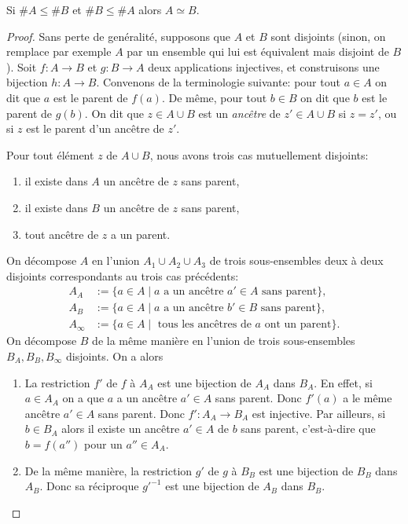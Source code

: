 \documentclass[french,course,oneside,theoremnosection]{lecture}
\begin{document}
\begin{theorem}
Si $\# A \leq \# B$ et $\# B \leq \# A$ alors $A \simeq B$.
\end{theorem}
\begin{proof}
Sans perte de genéralité, supposons que $A$ et $B$ sont disjoints (sinon, on remplace par exemple $A$ par un ensemble qui lui est équivalent mais disjoint de $B$).
Soit $f\colon A \to B$ et $g\colon B \to A$ deux applications injectives, et construisons une bijection $h\colon A \to B$. Convenons de la terminologie suivante: pour tout $a \in A$ on dit que $a$ est le parent de $f(a).$ De même, pour tout $b\in B$ on dit que $b$ est le parent de $g(b)$. On dit que $z\in A \cup B$ est un  \emph{ancêtre} de $z'\in A \cup B$ si $z=z'$, ou si $z$ est le parent d'un ancêtre de $z'$.

Pour tout élément $z$ de $A \cup B$, nous avons trois cas mutuellement disjoints:
\begin{enumerate}[(1)]
\item il existe dans $A$ un ancêtre de $z$ sans parent,
\item il existe dans $B$ un ancêtre de $z$ sans parent,
\item tout ancêtre de $z$ a un parent.
\end{enumerate}
On décompose $A$ en l'union $A_1\cup A_2 \cup A_3$ de trois sous-ensembles deux à deux disjoints correspondants au trois cas précédents:
\begin{align*}
A_A &:= \{a \in A \mid a \text{ a un ancêtre $a' \in A$ sans parent}\},\\
A_B &:= \{a \in A \mid a \text{ a un ancêtre $b' \in B$ sans parent}\},\\
A_\infty &:= \{a \in A \mid \text{ tous les ancêtres de $a$ ont un parent}\}.
\end{align*}
On décompose $B$ de la même manière en l'union de trois sous-ensembles $B_A, B_B, B_\infty$ disjoints. On a alors
\begin{enumerate}[(1)]
\item La restriction $f'$ de $f$ à $A_A$ est une bijection de $A_A$ dans $B_A$. En effet, si $a\in A_A$ on a que $a$ a un ancêtre $a'\in A$ sans parent. Donc $f'(a)$ a le même ancêtre $a'\in A$ sans parent. Donc $f'\colon A_A \to B_A$ est injective. Par ailleurs, si $b\in B_A$ alors il existe un ancêtre $a'\in A$ de $b$ sans parent, c'est-à-dire que $b=f(a'')$ pour un $a''\in A_A$.

\item De la même manière, la restriction $g'$ de $g$ à $B_B$ est une bijection de $B_B$ dans $A_B$. Donc sa réciproque $g'^{-1}$ est une bijection de $A_B$ dans $B_B$.


\end{enumerate}
\end{proof}
\end{document}
